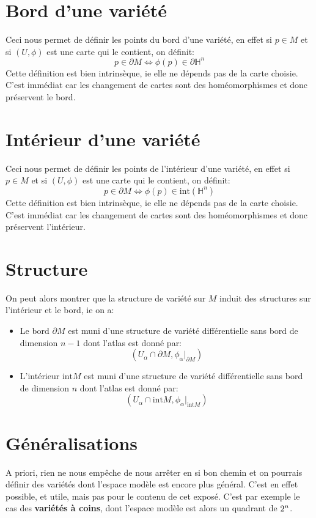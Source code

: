    \section{Bord d'une variété}
      Ceci nous permet de définir les points du bord d'une variété, en effet si \( p \in M \) et si \( (U, \phi) \) est une carte qui le contient, on définit:
      \[ 
         p \in \partial M \iff \phi(p) \in \partial \mathbb{H}^n 
      \]
      Cette définition est bien intrinsèque, ie elle ne dépends pas de la carte choisie. C'est immédiat car les changement de cartes sont des homéomorphismes et donc préservent le bord.
   \section{Intérieur d'une variété}
      Ceci nous permet de définir les points de l'intérieur d'une variété, en effet si \( p \in M \) et si \( (U, \phi) \) est une carte qui le contient, on définit:
      \[ 
         p \in \partial M \iff \phi(p) \in \text{int}(\mathbb{H}^n) 
      \]
      Cette définition est bien intrinsèque, ie elle ne dépends pas de la carte choisie. C'est immédiat car les changement de cartes sont des homéomorphismes et donc préservent l'intérieur.
   \section{Structure}
   On peut alors montrer que la structure de variété sur \( M \) induit des structures sur l'intérieur et le bord, ie on a:
   \begin{itemize}
      \item Le bord \( \partial M \) est muni d'une structure de variété différentielle sans bord de dimension \( n - 1 \) dont l'atlas est donné par:
      \[ 
         (U_\alpha \cap \partial M, \phi_\alpha|_{\partial M})
      \] 
      \item L'intérieur \( \text{int} M \) est muni d'une structure de variété différentielle sans bord de dimension \( n \) dont l'atlas est donné par:
      \[ 
         (U_\alpha \cap \text{int} M, \phi_\alpha|_{\text{int} M})
      \]    
   \end{itemize}
      
   \section{Généralisations}
      A priori, rien ne nous empêche de nous arrêter en si bon chemin et on pourrais définir des variétés dont l'espace modèle est encore plus général. C'est en effet possible, et utile, mais pas pour le contenu de cet exposé. C'est par exemple le cas des \textbf{variétés à coins}, dont l'espace modèle est alors un quadrant de \( 2^n \).
